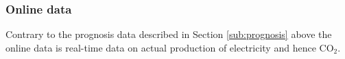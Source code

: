 \documentclass[Main]{subfiles}
\begin{document}

		\subsubsection{Online data} %
		\label{sub:online_data}
			Contrary to the prognosis data described in Section \ref{sub:prognosis} above the online data is real-time data on actual production of electricity and hence CO$_2$.


		


\end{document}
